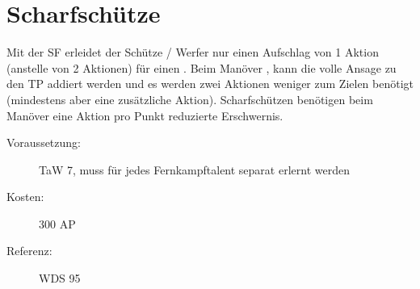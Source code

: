 \section{Scharfschütze}
\label{sf.scharfschuetze}
Mit der SF  erleidet der Schütze / Werfer nur einen Aufschlag von 1 Aktion (anstelle von 2 Aktionen) für einen .
Beim Manöver , kann die volle Ansage zu den TP addiert werden und es werden zwei Aktionen weniger zum Zielen benötigt (mindestens aber eine zusätzliche Aktion).
Scharfschützen benötigen beim Manöver  eine Aktion pro Punkt reduzierte Erschwernis.
\begin{description}
    \item[Voraussetzung:]
        TaW  7, muss für jedes Fernkampftalent separat erlernt werden
    \item [Kosten:]
        300 AP
    \item [Referenz:]
        WDS 95
\end{description}
